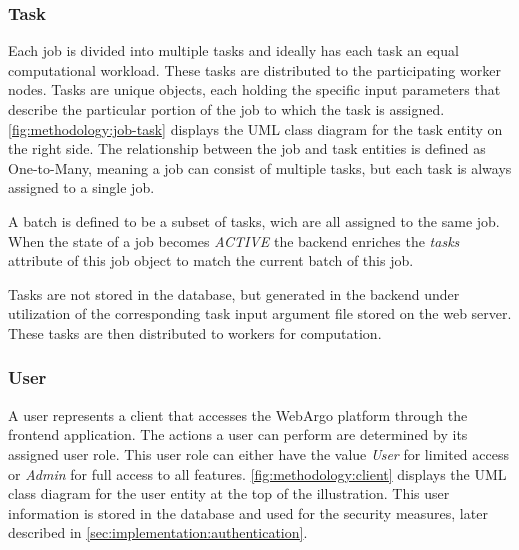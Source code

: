 \subsubsection{Task}
Each job is divided into multiple tasks and ideally has each task an equal computational workload. These tasks are distributed to the participating worker nodes. Tasks are unique objects, each holding the specific input parameters that describe the particular portion of the job to which the task is assigned. \autoref{fig:methodology:job-task} displays the \ac{UML} class diagram for the task entity on the right side. The relationship between the job and task entities is defined as One-to-Many, meaning a job can consist of multiple tasks, but each task is always assigned to a single job.

A batch is defined to be a subset of tasks, wich are all assigned to the same job. When the state of a job becomes \emph{ACTIVE} the backend enriches the \emph{tasks} attribute of this job object to match the current batch of this job.

Tasks are not stored in the database, but generated in the backend under utilization of the corresponding task input argument file stored on the web server. These tasks are then distributed to workers for computation.

\subsubsection{User}
A user represents a client that accesses the WebArgo platform through the frontend application. The actions a user can perform are determined by its assigned user role. This user role can either have the value \emph{User} for limited access or \emph{Admin} for full access to all features. \autoref{fig:methodology:client} displays the \ac{UML} class diagram for the user entity at the top of the illustration. This user information is stored in the database and used for the security measures, later described in \autoref{sec:implementation:authentication}. 

